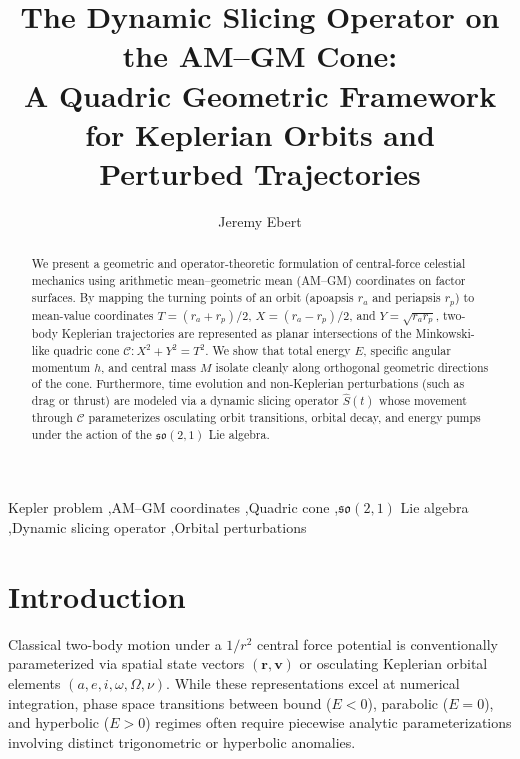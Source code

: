 \documentclass[11pt,3p,twocolumn]{elsarticle}
\begin{document}
\begin{frontmatter}

\title{The Dynamic Slicing Operator on the AM--GM Cone: \\ A Quadric Geometric Framework for Keplerian Orbits and Perturbed Trajectories}

\author{Jeremy Ebert}
\address{Franklin County, Ohio, USA}

\begin{abstract}
We present a geometric and operator-theoretic formulation of central-force celestial mechanics using arithmetic mean--geometric mean (AM--GM) coordinates on factor surfaces. By mapping the turning points of an orbit (apoapsis $r_a$ and periapsis $r_p$) to mean-value coordinates $T = (r_a+r_p)/2$, $X = (r_a-r_p)/2$, and $Y = \sqrt{r_a r_p}$, two-body Keplerian trajectories are represented as planar intersections of the Minkowski-like quadric cone $\mathcal{C}: X^2 + Y^2 = T^2$. We show that total energy $E$, specific angular momentum $h$, and central mass $M$ isolate cleanly along orthogonal geometric directions of the cone. Furthermore, time evolution and non-Keplerian perturbations (such as drag or thrust) are modeled via a dynamic slicing operator $\hat{S}(t)$ whose movement through $\mathcal{C}$ parameterizes osculating orbit transitions, orbital decay, and energy pumps under the action of the $\mathfrak{so}(2,1)$ Lie algebra.
\end{abstract}

\begin{keyword}
Kepler problem \sep AM--GM coordinates \sep Quadric cone \sep $\mathfrak{so}(2,1)$ Lie algebra \sep Dynamic slicing operator \sep Orbital perturbations
\end{keyword}

\end{frontmatter}

\section{Introduction}
Classical two-body motion under a $1/r^2$ central force potential is conventionally parameterized via spatial state vectors $(\mathbf{r}, \mathbf{v})$ or osculating Keplerian orbital elements $(a, e, i, \omega, \Omega, \nu)$. While these representations excel at numerical integration, phase space transitions between bound ($E < 0$), parabolic ($E = 0$), and hyperbolic ($E > 0$) regimes often require piecewise analytic parameterizations involving distinct trigonometric or hyperbolic anomalies.
\end{document}
